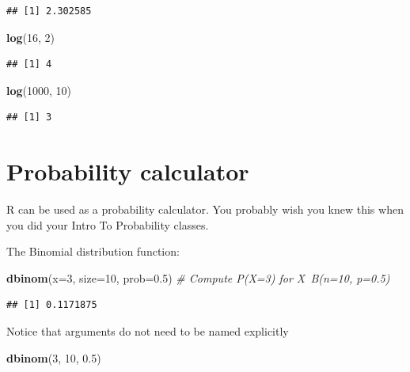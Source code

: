 \documentclass[]{book}
\newenvironment{Shaded}{\begin{snugshade}}{\end{snugshade}}
\newcommand{\KeywordTok}[1]{\textcolor[rgb]{0.13,0.29,0.53}{\textbf{#1}}}
\newcommand{\DataTypeTok}[1]{\textcolor[rgb]{0.13,0.29,0.53}{#1}}
\newcommand{\DecValTok}[1]{\textcolor[rgb]{0.00,0.00,0.81}{#1}}
\newcommand{\FloatTok}[1]{\textcolor[rgb]{0.00,0.00,0.81}{#1}}
\newcommand{\CommentTok}[1]{\textcolor[rgb]{0.56,0.35,0.01}{\textit{#1}}}
\newcommand{\NormalTok}[1]{#1}
\theoremstyle{definition}
\theoremstyle{definition}
\theoremstyle{definition}
\theoremstyle{remark}
\begin{document}
\begin{verbatim}
## [1] 2.302585
\end{verbatim}

\begin{Shaded}
\begin{Highlighting}[]
\KeywordTok{log}\NormalTok{(}\DecValTok{16}\NormalTok{, }\DecValTok{2}\NormalTok{)                      }
\end{Highlighting}
\end{Shaded}

\begin{verbatim}
## [1] 4
\end{verbatim}

\begin{Shaded}
\begin{Highlighting}[]
\KeywordTok{log}\NormalTok{(}\DecValTok{1000}\NormalTok{, }\DecValTok{10}\NormalTok{)                   }
\end{Highlighting}
\end{Shaded}

\begin{verbatim}
## [1] 3
\end{verbatim}

\section{Probability calculator}\label{probability-calculator}

R can be used as a probability calculator. You probably wish you knew
this when you did your Intro To Probability classes.

The Binomial distribution function:

\begin{Shaded}
\begin{Highlighting}[]
\KeywordTok{dbinom}\NormalTok{(}\DataTypeTok{x=}\DecValTok{3}\NormalTok{, }\DataTypeTok{size=}\DecValTok{10}\NormalTok{, }\DataTypeTok{prob=}\FloatTok{0.5}\NormalTok{)  }\CommentTok{# Compute P(X=3) for X~B(n=10, p=0.5) }
\end{Highlighting}
\end{Shaded}

\begin{verbatim}
## [1] 0.1171875
\end{verbatim}

Notice that arguments do not need to be named explicitly

\begin{Shaded}
\begin{Highlighting}[]
\KeywordTok{dbinom}\NormalTok{(}\DecValTok{3}\NormalTok{, }\DecValTok{10}\NormalTok{, }\FloatTok{0.5}\NormalTok{)}
\end{Highlighting}
\end{Shaded}
\end{document}
